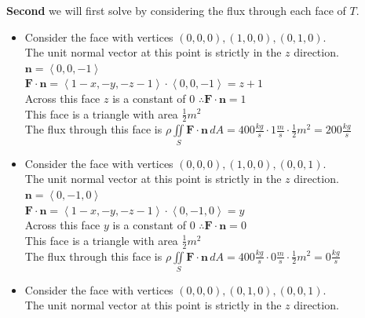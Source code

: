 \documentclass[10pt]{article}
\begin{document}
\noindent
\textbf{Second} we will first solve by considering the flux through each face of $ T $. \\

\begin{itemize}
    \item Consider the face with vertices $ (0,0,0), (1,0,0), (0,1,0) $. \\
    \subitem The unit normal vector at this point is strictly in the $ z $ direction. \\
    \subitem $ \displaystyle \textbf{n} = \left< 0,0,-1 \right> $ \\
    \subitem $ \displaystyle \textbf{F} \cdot \textbf{n} = \left<1-x,-y,-z-1\right> \cdot \left< 0,0,-1 \right> = z + 1 $ \\
    \subitem Across this face $ z $ is a constant of 0 $ \therefore \textbf{F} \cdot \textbf{n} = 1 $ \\
    \subitem This face is a triangle with area $ \displaystyle \frac{1}{2}m^2 $ \\
    \subitem The flux through this face is $ \displaystyle \rho \iint \limits_{S} \textbf{F} \cdot \textbf{n} \, dA = 400\tfrac{kg}{s} \cdot 1\tfrac{m}{s} \cdot \frac{1}{2}m^2 = 200\tfrac{kg}{s} $ \\
    \item Consider the face with vertices $ (0,0,0), (1,0,0), (0,0,1) $. \\
    \subitem The unit normal vector at this point is strictly in the $ z $ direction. \\
    \subitem $ \displaystyle \textbf{n} = \left< 0,-1,0 \right> $ \\
    \subitem $ \displaystyle \textbf{F} \cdot \textbf{n} = \left<1-x,-y,-z-1\right> \cdot \left< 0,-1,0 \right> = y $ \\
    \subitem Across this face $ y $ is a constant of 0 $ \therefore \textbf{F} \cdot \textbf{n} = 0 $ \\
    \subitem This face is a triangle with area $ \displaystyle \frac{1}{2}m^2 $ \\
    \subitem The flux through this face is $ \displaystyle \rho \iint \limits_{S} \textbf{F} \cdot \textbf{n} \, dA = 400\tfrac{kg}{s} \cdot 0\tfrac{m}{s} \cdot \frac{1}{2}m^2 = 0\tfrac{kg}{s} $ \\
    \item Consider the face with vertices $ (0,0,0), (0,1,0), (0,0,1) $. \\
    \subitem The unit normal vector at this point is strictly in the $ z $ direction. \\

\end{itemize}
\end{document}
